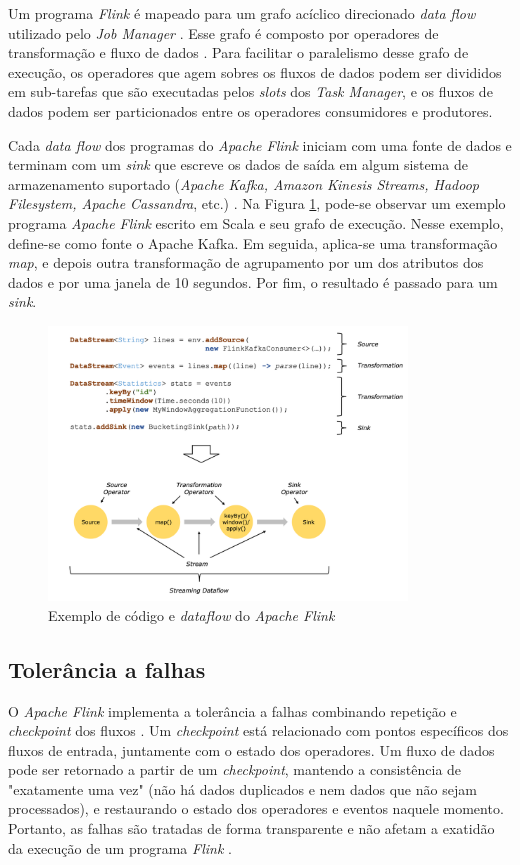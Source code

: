 Um programa \emph{Flink} é mapeado para um grafo acíclico direcionado \emph{data flow} utilizado pelo \emph{Job Manager} \cite{Carbone2015}. Esse grafo é composto por operadores de transformação e fluxo de dados \cite{ApacheFlink2020}. Para facilitar o paralelismo desse grafo de execução, os operadores que agem sobres os fluxos de dados podem ser divididos em sub-tarefas que são executadas pelos \emph{slots} dos \emph{Task Manager}, e os fluxos de dados podem ser particionados entre os operadores consumidores e produtores. 

Cada \emph{data flow} dos programas do \emph{Apache Flink} iniciam com uma fonte de dados e terminam com um \emph{sink} que escreve os dados de saída em algum sistema de armazenamento suportado (\emph{Apache Kafka, Amazon Kinesis Streams, Hadoop Filesystem, Apache Cassandra}, etc.) \cite{ApacheFlink2020}. Na Figura \ref{dataflow-flink}, pode-se observar um exemplo programa \emph{Apache Flink} escrito em Scala e seu grafo de execução. Nesse exemplo, define-se como fonte o Apache Kafka. Em seguida, aplica-se uma transformação \emph{map}, e depois outra transformação de agrupamento por um dos atributos dos dados e por uma janela de 10 segundos. Por fim, o resultado é passado para um \emph{sink}.

\begin{figure}[ht]
\centering
\includegraphics[width=0.85\textwidth]{figuras/dataflow-code-flink.png}
\caption{Exemplo de código e \emph{dataflow} do \emph{Apache Flink} \cite{ApacheFlink2020}}
\label{dataflow-flink}
\end{figure}

\subsection{Tolerância a falhas}
O \emph{Apache Flink} implementa a tolerância a falhas combinando repetição e \emph{checkpoint} dos fluxos \cite{Carbone2015,ApacheFlink2020}. Um \emph{checkpoint} está relacionado com pontos específicos dos fluxos de entrada, juntamente com o estado dos operadores. Um fluxo de dados pode ser retornado a partir de um \emph{checkpoint}, mantendo a consistência de "exatamente uma vez" (não há dados duplicados e nem dados que não sejam processados), e restaurando o estado dos operadores e eventos naquele momento. Portanto, as falhas são tratadas de forma transparente e não afetam a exatidão da execução de um programa \emph{Flink} \cite{ApacheFlink2020}. 

